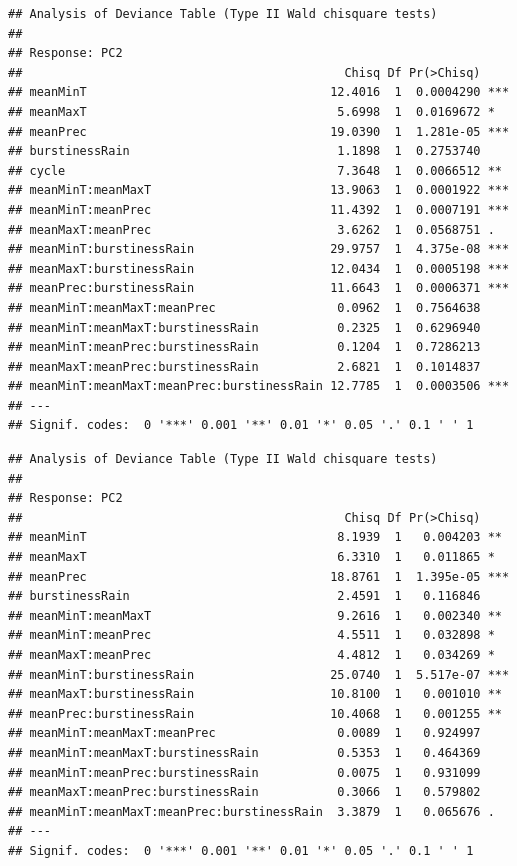 \documentclass[
]{article}
\begin{document}
\begin{verbatim}
## Analysis of Deviance Table (Type II Wald chisquare tests)
## 
## Response: PC2
##                                             Chisq Df Pr(>Chisq)    
## meanMinT                                  12.4016  1  0.0004290 ***
## meanMaxT                                   5.6998  1  0.0169672 *  
## meanPrec                                  19.0390  1  1.281e-05 ***
## burstinessRain                             1.1898  1  0.2753740    
## cycle                                      7.3648  1  0.0066512 ** 
## meanMinT:meanMaxT                         13.9063  1  0.0001922 ***
## meanMinT:meanPrec                         11.4392  1  0.0007191 ***
## meanMaxT:meanPrec                          3.6262  1  0.0568751 .  
## meanMinT:burstinessRain                   29.9757  1  4.375e-08 ***
## meanMaxT:burstinessRain                   12.0434  1  0.0005198 ***
## meanPrec:burstinessRain                   11.6643  1  0.0006371 ***
## meanMinT:meanMaxT:meanPrec                 0.0962  1  0.7564638    
## meanMinT:meanMaxT:burstinessRain           0.2325  1  0.6296940    
## meanMinT:meanPrec:burstinessRain           0.1204  1  0.7286213    
## meanMaxT:meanPrec:burstinessRain           2.6821  1  0.1014837    
## meanMinT:meanMaxT:meanPrec:burstinessRain 12.7785  1  0.0003506 ***
## ---
## Signif. codes:  0 '***' 0.001 '**' 0.01 '*' 0.05 '.' 0.1 ' ' 1
\end{verbatim}

\begin{verbatim}
## Analysis of Deviance Table (Type II Wald chisquare tests)
## 
## Response: PC2
##                                             Chisq Df Pr(>Chisq)    
## meanMinT                                   8.1939  1   0.004203 ** 
## meanMaxT                                   6.3310  1   0.011865 *  
## meanPrec                                  18.8761  1  1.395e-05 ***
## burstinessRain                             2.4591  1   0.116846    
## meanMinT:meanMaxT                          9.2616  1   0.002340 ** 
## meanMinT:meanPrec                          4.5511  1   0.032898 *  
## meanMaxT:meanPrec                          4.4812  1   0.034269 *  
## meanMinT:burstinessRain                   25.0740  1  5.517e-07 ***
## meanMaxT:burstinessRain                   10.8100  1   0.001010 ** 
## meanPrec:burstinessRain                   10.4068  1   0.001255 ** 
## meanMinT:meanMaxT:meanPrec                 0.0089  1   0.924997    
## meanMinT:meanMaxT:burstinessRain           0.5353  1   0.464369    
## meanMinT:meanPrec:burstinessRain           0.0075  1   0.931099    
## meanMaxT:meanPrec:burstinessRain           0.3066  1   0.579802    
## meanMinT:meanMaxT:meanPrec:burstinessRain  3.3879  1   0.065676 .  
## ---
## Signif. codes:  0 '***' 0.001 '**' 0.01 '*' 0.05 '.' 0.1 ' ' 1
\end{verbatim}
\end{document}
